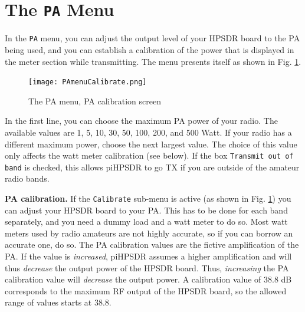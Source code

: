 \documentclass[12pt]{book}
\def\rett#1{\texttt{\color{red}#1}}
\def\bltt#1{\texttt{\color{blue}#1}}
\def\pH{pi\-HPSDR\xspace}
\begin{document}
\section{The \texttt{PA} Menu}
\label{sec:PAmenu}

In the \bltt{PA} menu, you can adjust the output level of your HPSDR board
to the PA being used, and you can establish a calibration of the
power that is displayed in the meter section while transmitting.
The menu presents itself as shown in Fig. \ref{fig:PAMenuCalibrate}.

\begin{figure}[ht]
\center
\texttt{[image: PAmenuCalibrate.png]}
\caption{The PA menu, PA calibration screen}
\label{fig:PAMenuCalibrate}
\end{figure}

In the first line, you can choose the maximum PA power of your
radio. The available values are 1, 5, 10, 30, 50, 100, 200, and
500 Watt. If your radio has a different maximum power, choose the
next largest value. The choice of this value only affects the
watt meter calibration (see below). If the  box
\rett{Transmit out of band} is checked, this allows \pH
to go TX if you are outside of the amateur radio bands.



\textbf{PA calibration.} If the \rett{Calibrate} sub-menu is active
(as shown in Fig. \ref{fig:PAMenuCalibrate}) you can adjust your
HPSDR board to your PA. This has to be done for each band separately,
and you need a dummy load and a watt meter to do so. Most watt meters
used by radio amateurs are not highly accurate, so if you can borrow
an accurate one, do so. The PA calibration values are the fictive
amplification of the PA. If the value is \textit{increased},
\pH assumes a higher amplification and will thus \textit{decrease}
the output power of the HPSDR board. Thus, \textit{increasing} the
PA calibration value will \textit{decrease} the output power. A calibration
value of 38.8 dB corresponds to the maximum RF output of the HPSDR board,
so the allowed range of values starts at 38.8.
\end{document}
